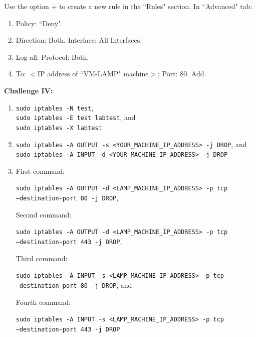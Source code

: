 \documentclass[12pt]{extarticle}
\begin{document}
\noindent 
Use the option + to create a new rule in the ``Rules" section. In ``Advanced" tab:

\begin{enumerate}
\item Policy: ``Deny".  
\item Direction: Both. Interface: All Interfaces.
\item Log all. Protocol: Both.
\item To: $<$IP address of ``VM-LAMP" machine$>$; Port: 80. Add.
\end{enumerate}


\vspace{4mm}
\item \textbf{Challenge IV:}\\

\begin{enumerate}
\item \texttt{sudo iptables -N test},\\ 
\texttt{sudo iptables -E test labtest}, and\\ 
\texttt{sudo iptables -X labtest}\\
  
\item \texttt{sudo iptables -A OUTPUT -s <YOUR\_MACHINE\_IP\_ADDRESS> -j DROP}, and\\ 
\texttt{sudo iptables -A INPUT -d <YOUR\_MACHINE\_IP\_ADDRESS> -j DROP}\\

\item First command:
 
\vspace{2mm}
\noindent
\texttt{sudo iptables -A OUTPUT -d <LAMP\_MACHINE\_IP\_ADDRESS> -p tcp\\ --destination-port 80 -j DROP},

\vspace{4mm}
\noindent
Second command: 

\vspace{2mm}
\noindent
\texttt{sudo iptables -A OUTPUT -d <LAMP\_MACHINE\_IP\_ADDRESS> -p tcp\\ --destination-port 443 -j DROP},

\vspace{4mm}
\noindent
Third command:

\vspace{2mm}
\noindent 
\texttt{sudo iptables -A INPUT -s <LAMP\_MACHINE\_IP\_ADDRESS> -p tcp\\ --destination-port 80 -j DROP}, and 

\vspace{4mm}
\noindent
Fourth command:

\vspace{2mm}
\noindent
\texttt{sudo iptables -A INPUT -s <LAMP\_MACHINE\_IP\_ADDRESS> -p tcp \\--destination-port 443 -j DROP} \\   
\end{enumerate}
\end{document}
